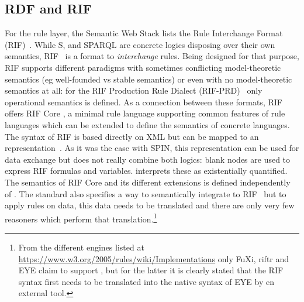 \subsection{RDF and RIF}
For the rule layer, the Semantic Web Stack lists the Rule Interchange Format (RIF)~\cite{rif}.
While \rdf{}S, \owl and SPARQL are concrete logics disposing 
over their own semantics, RIF~\cite{rif} is a format to \emph{interchange} rules. 
Being designed for that purpose, RIF supports different paradigms with sometimes 
conflicting model-theoretic semantics (eg well-founded vs stable semantics) or even with no model-theoretic semantics at all: 
for the RIF Production Rule Dialect (RIF-PRD)~\cite{rifprd} only operational semantics is defined. 
As a connection between these formats, RIF offers RIF Core \cite{rifcore}, a minimal rule language supporting common features of rule languages which can be 
extended to define the semantics of concrete languages.
The syntax of RIF is based directly on XML but can be mapped to an \rdf representation~\cite{rifinrdf}. 
As it was the case with SPIN, this representation can be used for data exchange but does not really combine both logics: 
blank nodes are used to express RIF formulas and variables. \rdf interprets these as existentially quantified.
The semantics of 
RIF Core and its different extensions is defined independently of \rdf. 
The standard also specifies a way to semantically integrate \rdf to RIF~\cite{rifrdf} but to apply rules on \rdf data, this data needs to be translated
and there are only very few reasoners which perform that translation.\footnote{From the different engines listed at \url{https://www.w3.org/2005/rules/wiki/Implementations}
only FuXi, riftr and EYE 
claim to support \rdf, but for the latter it is clearly stated that the RIF syntax first needs to be translated into the native syntax of EYE by en external tool. }
